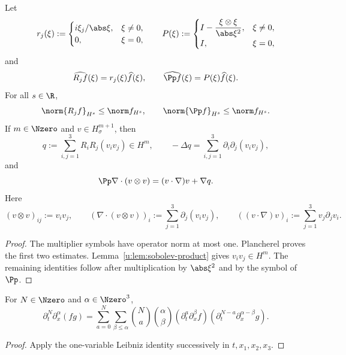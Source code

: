 \begin{lemma}
\label{u:lem:riesz-leray}
Let
\[
 r_j(\xi):=
 \begin{cases}
 i\xi_j/\abs\xi,&\xi\ne0,\\
 0,&\xi=0,
 \end{cases}
 \qquad
 P(\xi):=
 \begin{cases}
 I-\dfrac{\xi\otimes\xi}{\abs\xi^2},&\xi\ne0,\\
 I,&\xi=0,
 \end{cases}
\]
and
\[
 \widehat{R_jf}(\xi)=r_j(\xi)\widehat f(\xi),
 \qquad
 \widehat{\Pp f}(\xi)=P(\xi)\widehat f(\xi).
\]
For all \(s\in\R\),
\[
 \norm{R_jf}_{H^s}\le\norm f_{H^s},
 \qquad
 \norm{\Pp f}_{H^s}\le\norm f_{H^s}.
\]
If \(m\in\Nzero\) and \(v\in H^{m+1}_\sigma\), then
\[
 q:=\sum_{i,j=1}^3R_iR_j(v_iv_j)\in H^m,
 \qquad
 -\Delta q=\sum_{i,j=1}^3\partial_i\partial_j(v_iv_j),
\]
and
\[
 \Pp\nabla\cdot(v\otimes v)
 =(v\cdot\nabla)v+\nabla q.
\]
Here
\[
 (v\otimes v)_{ij}:=v_iv_j,
 \qquad
 (\nabla\cdot(v\otimes v))_i
 :=\sum_{j=1}^3\partial_j(v_iv_j),
 \qquad
 ((v\cdot\nabla)v)_i:=\sum_{j=1}^3v_j\partial_jv_i.
\]
\end{lemma}

\begin{proof}
The multiplier symbols have operator norm at most one.  Plancherel proves the
first two estimates.  Lemma~\ref{u:lem:sobolev-product} gives
\(v_iv_j\in H^m\).  The remaining identities follow after multiplication by
\(\abs\xi^2\) and by the symbol of \(\Pp\).
\end{proof}

\begin{lemma}
\label{u:lem:mixed-leibniz}
For \(N\in\Nzero\) and \(\alpha\in\Nzero^3\),
\[
 \partial_t^N\partial_x^\alpha(fg)
 =\sum_{a=0}^N\sum_{\beta\le\alpha}
 \binom Na\binom\alpha\beta
 (\partial_t^a\partial_x^\beta f)
 (\partial_t^{N-a}\partial_x^{\alpha-\beta}g).
\]
\end{lemma}

\begin{proof}
Apply the one-variable Leibniz identity successively in \(t,x_1,x_2,x_3\).
\end{proof}

